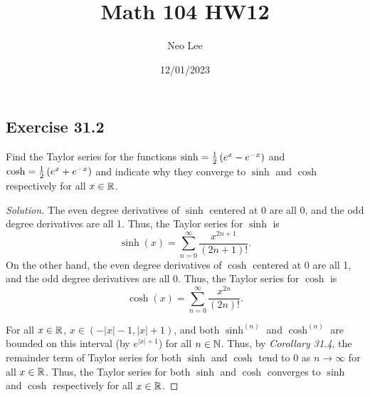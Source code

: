 \documentclass{article}
\title{Math 104 HW12}
\author{Neo Lee}
\date{12/01/2023}
\begin{document}
 

\maketitle 

\subsection*{Exercise 31.2}
Find the Taylor series for the functions $\sinh =\frac{1}{2}\left(e^x-e^{-x}\right)$ 
and $\cosh =\frac{1}{2}\left(e^x+e^{-x}\right)$ and indicate why they converge to 
$\sinh$ and $\cosh$ respectively for all $x\in\mathbb{R}$.
\begin{proof}[Solution]
    The even degree derivatives of $\sinh$ centered at 0 are 
    all 0, and the odd degree derivatives are all 1. Thus, the Taylor series 
    for $\sinh$ is
    \[
        \sinh(x) = \sum_{n=0}^\infty \frac{x^{2n+1}}{(2n+1)!}.
    \]
    On the other hand, the even degree derivatives of $\cosh$ centered at 0
    are all 1, and the odd degree derivatives are all 0. Thus, the Taylor series
    for $\cosh$ is
    \[
        \cosh(x) = \sum_{n=0}^\infty \frac{x^{2n}}{(2n)!}.
    \]
    
    For all $x\in\mathbb{R}$, $x\in(-|x|-1,|x|+1)$, and both $\sinh^{(n)}$ and $\cosh^{(n)}$ 
    are bounded on this interval (by $e^{|x|+1}$) for all $n\in\mathbb{N}$. Thus, by \emph{Corollary 31.4},
    the remainder term of Taylor series for both $\sinh$ and $\cosh$ tend to 0 
    as $n\to\infty$ for all $x\in\mathbb{R}$. Thus, the Taylor series for both $\sinh$ 
    and $\cosh$ converges to $\sinh$ and $\cosh$ respectively for all $x\in\mathbb{R}$.
\end{proof}

\newpage
\end{document}
